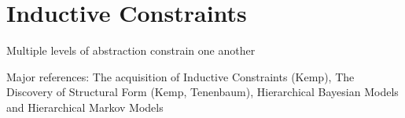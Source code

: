 \chapter{Inductive Constraints}
Multiple levels of abstraction constrain one another

Major references:
The acquisition of Inductive Constraints (Kemp),
The Discovery of Structural Form (Kemp, Tenenbaum),
Hierarchical Bayesian Models and Hierarchical Markov Models
